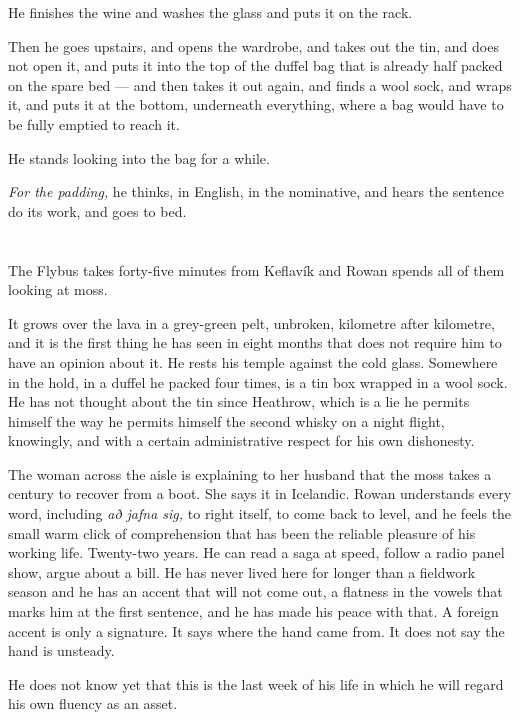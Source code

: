 \documentclass[11pt,oneside]{book}
\begin{document}
He finishes the wine and washes the glass and puts it on the rack.

Then he goes upstairs, and opens the wardrobe, and takes out the tin,
and does not open it, and puts it into the top of the duffel bag that is
already half packed on the spare bed --- and then takes it out again, and
finds a wool sock, and wraps it, and puts it at the bottom, underneath
everything, where a bag would have to be fully emptied to reach it.

He stands looking into the bag for a while.

\emph{For the padding,} he thinks, in English, in the nominative, and
hears the sentence do its work, and goes to bed.

\chapter{}

The Flybus takes forty-five minutes from Keflavík and Rowan spends all
of them looking at moss.

It grows over the lava in a grey-green pelt, unbroken, kilometre after
kilometre, and it is the first thing he has seen in eight months that
does not require him to have an opinion about it. He rests his temple
against the cold glass. Somewhere in the hold, in a duffel he packed
four times, is a tin box wrapped in a wool sock. He has not thought
about the tin since Heathrow, which is a lie he permits himself the way
he permits himself the second whisky on a night flight, knowingly, and
with a certain administrative respect for his own dishonesty.

The woman across the aisle is explaining to her husband that the moss
takes a century to recover from a boot. She says it in Icelandic. Rowan
understands every word, including \emph{að jafna sig,} to right itself,
to come back to level, and he feels the small warm click of comprehension
that has been the reliable pleasure of his working life. Twenty-two
years. He can read a saga at speed, follow a radio panel show, argue
about a bill. He has never lived here for longer than a fieldwork season
and he has an accent that will not come out, a flatness in the vowels
that marks him at the first sentence, and he has made his peace with
that. A foreign accent is only a signature. It says where the hand came
from. It does not say the hand is unsteady.

He does not know yet that this is the last week of his life in which he
will regard his own fluency as an asset.
\end{document}
